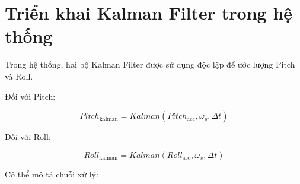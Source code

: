 \documentclass[a4paper,12pt]{report}
\begin{document}
\section{Triển khai Kalman Filter trong hệ thống}
\label{sec:kalman-implementation}

Trong hệ thống, hai bộ Kalman Filter được sử dụng độc lập để ước lượng Pitch và Roll.

Đối với Pitch:

\begin{equation}
Pitch_{\text{kalman}}
=
Kalman
\left(
Pitch_{\text{acc}},
\omega_y,
\Delta t
\right)
\end{equation}

Đối với Roll:

\begin{equation}
Roll_{\text{kalman}}
=
Kalman
\left(
Roll_{\text{acc}},
\omega_x,
\Delta t
\right)
\end{equation}

Có thể mô tả chuỗi xử lý:
\end{document}
